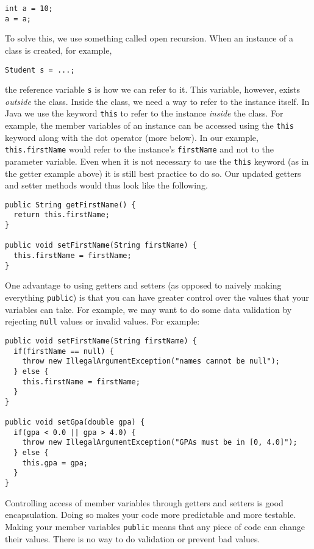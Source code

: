 \begin{verbatim}
int a = 10;
a = a;
\end{verbatim}

To solve this, we use something called 
\gls{open recursion}.  When an instance of a class
is created, for example, 

\texttt{Student s = ...;}

the reference variable \texttt{s} is how we can refer
to it.  This variable, however, exists \emph{outside} the class.  
Inside the class, we need a way to refer to the instance itself.
In Java we use the keyword \texttt{this} to refer to the
instance \emph{inside} the class.  For example, the member variables
of an instance can be accessed using the \texttt{this} 
keyword along with the dot operator (more below).  In our example, 
\texttt{this.firstName} would refer to the instance's
\texttt{firstName} and not to the parameter variable.
Even when it is not necessary to use the \texttt{this}
keyword (as in the getter example above) it is still best practice
to do so.  Our updated getters and setter methods would thus look like
the following.

\begin{verbatim}
public String getFirstName() {
  return this.firstName;
}

public void setFirstName(String firstName) {
  this.firstName = firstName;
} 
\end{verbatim}

One advantage to using getters and setters (as opposed to naively
making everything \texttt{public}) is that you can have 
greater control over
the values that your variables can take.  For example, we may want
to do some data validation by rejecting \texttt{null}
values or invalid values.  For example:

\begin{verbatim}
public void setFirstName(String firstName) {
  if(firstName == null) {
    throw new IllegalArgumentException("names cannot be null");
  } else {
    this.firstName = firstName;
  }
} 

public void setGpa(double gpa) {
  if(gpa < 0.0 || gpa > 4.0) {
    throw new IllegalArgumentException("GPAs must be in [0, 4.0]");
  } else {
    this.gpa = gpa;
  }
} 
\end{verbatim}

Controlling access of member variables through getters and setters
is good encapsulation.  Doing so makes your code more predictable and
more testable.  Making your member variables \texttt{public}
means that any piece of code can change their values.  There is no
way to do validation or prevent bad values.  

